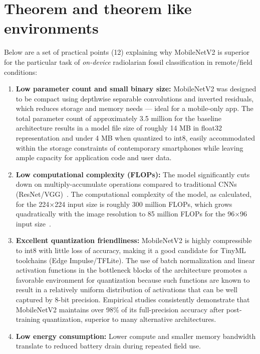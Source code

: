 \documentclass[a4paper,fleqn]{cas-sc}
\begin{document}
\FloatBarrier

\section[Theorem and ...]{Theorem and theorem like environments}

Below are a set of practical points (12) explaining why MobileNetV2 is superior for the particular task of \emph{on-device} radiolarian fossil classification in remote/field conditions:

\begin{enumerate}
  \item \textbf{Low parameter count and small binary size:} MobileNetV2 was designed to be compact using depthwise separable convolutions and inverted residuals, which reduces storage and memory needs — ideal for a mobile-only app. The total parameter count of approximately 3.5 million for the baseline architecture results in a model file size of roughly 14 MB in float32 representation and under 4 MB when quantized to int8, easily accommodated within the storage constraints of contemporary smartphones while leaving ample capacity for application code and user data.~\cite{sandler2018mobilenetv2}
  \item \textbf{Low computational complexity (FLOPs):} The model significantly cuts down on multiply-accumulate operations compared to traditional CNNs (ResNet/VGG)~\cite{he2016deep}. The computational complexity of the model, as calculated, for the 224×224 input size is roughly 300 million FLOPs, which grows quadratically with the image resolution to 85 million FLOPs for the 96×96 input size~\cite{sandler2018mobilenetv2}.
  \item \textbf{Excellent quantization friendliness:} MobileNetV2 is highly compressible to int8 with little loss of accuracy, making it a good candidate for TinyML toolchains (Edge Impulse/TFLite). The use of batch normalization and linear activation functions in the bottleneck blocks of the architecture promotes a favorable environment for quantization because such functions are known to result in a relatively uniform distribution of activations that can be well captured by 8-bit precision. Empirical studies consistently demonstrate that MobileNetV2 maintains over 98\% of its full-precision accuracy after post-training quantization, superior to many alternative architectures.~\cite{edgeimpulse2023, warden2019tinyml}
  \item \textbf{Low energy consumption:} Lower compute and smaller memory bandwidth translate to reduced battery drain during repeated field use. %

\end{enumerate}
\end{document}
